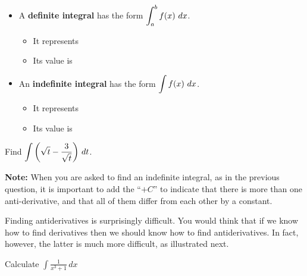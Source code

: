 \newpage
\begin{itemize}
\item A {\bf definite integral} has the form $\displaystyle \int_a^b f(x) ~dx$.
  \begin{itemize}
  \item It represents 
\vfill
  \item Its value is  
\vfill
  \end{itemize}
\vfill
\item An {\bf indefinite integral} has the form $\displaystyle \int f(x) ~dx$.
  \begin{itemize}
  \item It represents 
\vfill
  \item Its value is 
\vfill 
  \end{itemize}
\end{itemize}

\newpage
\begin{problem}
	Find $\displaystyle \int\left(\sqrt{t}-\frac{3}{\sqrt{t}}\right)\,dt$.
	
\end{problem}

\vfill
{\bf Note:}  When you are asked to find an indefinite integral, as
in the previous question, it is important to add the ``$+ C$'' to
indicate that there is more than one anti-derivative, and that all
of them differ from each other by a constant.\medskip

\newpage
Finding antiderivatives is surprisingly difficult.  You would think
that if we know how to find derivatives then we should know how to
find antiderivatives.  In fact, however, the latter is much more
difficult, as illustrated next.

\newpage
\begin{problem}
	Calculate $\displaystyle \int \frac{1}{x^3+1}\, dx$
	
\end{problem}

